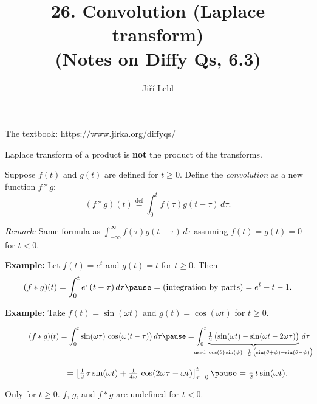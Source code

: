 \documentclass[10pt,aspectratio=169]{beamer}
\author{Ji\v{r}\'i Lebl}
\institute[OSU]{%
Oklahoma State University%
}
\title{26. Convolution (Laplace transform)\\(Notes on Diffy Qs, 6.3)}
\date{}
\begin{document}
\begin{frame}
\titlepage


\begin{center}
The textbook: \url{https://www.jirka.org/diffyqs/}
\end{center}
\end{frame}

\begin{frame}
Laplace transform of a product is \textbf{not} the product of the transforms.

\medskip
\pause

Suppose $f(t)$ and $g(t)$ are defined for $t \geq 0$.  Define
the \emph{convolution} as a new function $f * g$:
\[
(f * g)(t) \overset{\text{def}}{=}
\int_0^t f(\tau) g(t-\tau) \, d\tau .
\]

\pause

\emph{Remark:}  Same formula as
$\int_{-\infty}^\infty f(\tau) g(t-\tau) \, d\tau$
assuming $f(t)=g(t)=0$ for $t < 0$.

\medskip
\pause

\textbf{Example:}
Let $f(t) = e^t$ and $g(t) = t$ for $t \geq 0$.  Then 
\[
(f*g)(t)
=
\int_0^t e^\tau (t-\tau) \, d\tau
\pause
=
\text{(integration by parts)}
=
e^t - t - 1 .
\]

\pause

\textbf{Example:}
Take $f(t) = \sin (\omega t)$ and $g(t) = \cos (\omega t)$ for $t \geq 0$.

\smallskip

$\displaystyle
\quad\qquad
(f*g)(t)
=
\int_0^t  \sin ( \omega \tau ) \,
\cos \bigl( \omega (t-\tau) \bigr) \, d\tau
\pause
=
\int_0^t
\underbrace{
\tfrac{1}{2} \, \bigl( \sin (\omega t) - \sin (\omega t - 2 \omega \tau
) \bigr)
}_{\mathclap{\text{used } \cos (\theta) \sin (\psi) =
\frac{1}{2} \, \bigl( \sin (\theta + \psi) - \sin (\theta - \psi) \bigr)}}
\, d\tau
$

\medskip
\pause

$\displaystyle
\quad\qquad
\phantom{(f*g)(t)}
{} =
\left[ \tfrac{1}{2} \, \tau  \sin (\omega t) + \tfrac{1}{4\omega} \, \cos (2 \omega \tau -
\omega t) \right]_{\tau=0}^t
\pause
= \tfrac{1}{2} \, t \sin (\omega t) .
$

\medskip
\pause

Only for $t \geq 0$. \quad  $f$, $g$, and $f*g$ are undefined for $t < 0$.

\end{frame}
\end{document}

